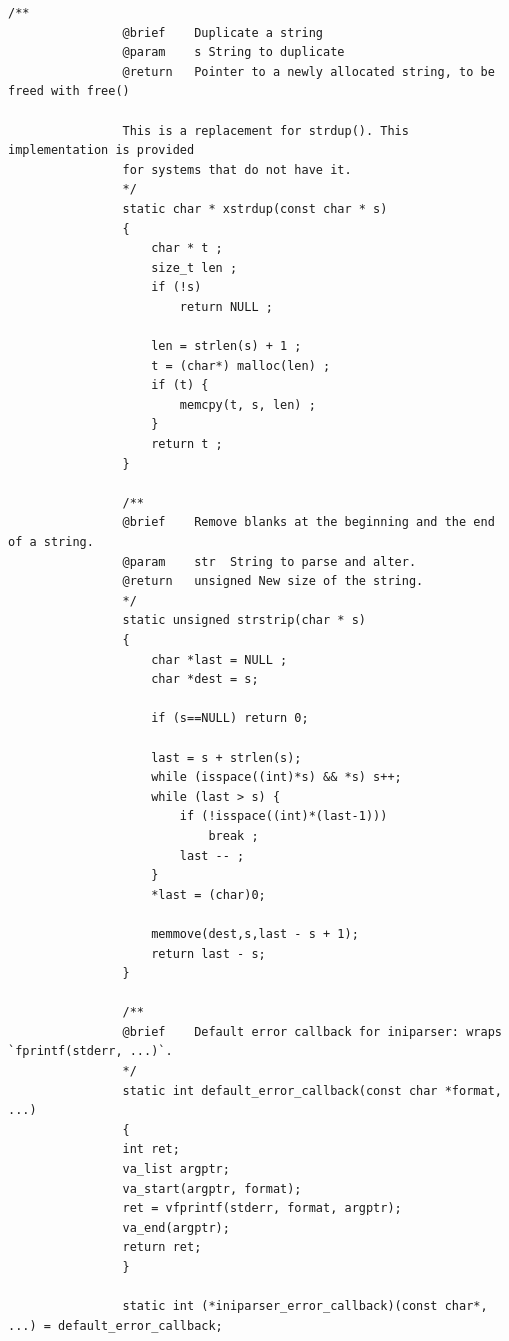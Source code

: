 \documentclass{article}
\begin{document}
\begin{Verbatim}[gobble=8]
                /**
                @brief    Duplicate a string
                @param    s String to duplicate
                @return   Pointer to a newly allocated string, to be freed with free()
                
                This is a replacement for strdup(). This implementation is provided
                for systems that do not have it.
                */
                static char * xstrdup(const char * s)
                {
                    char * t ;
                    size_t len ;
                    if (!s)
                        return NULL ;
                
                    len = strlen(s) + 1 ;
                    t = (char*) malloc(len) ;
                    if (t) {
                        memcpy(t, s, len) ;
                    }
                    return t ;
                }
                
                /**
                @brief    Remove blanks at the beginning and the end of a string.
                @param    str  String to parse and alter.
                @return   unsigned New size of the string.
                */
                static unsigned strstrip(char * s)
                {
                    char *last = NULL ;
                    char *dest = s;
                
                    if (s==NULL) return 0;
                
                    last = s + strlen(s);
                    while (isspace((int)*s) && *s) s++;
                    while (last > s) {
                        if (!isspace((int)*(last-1)))
                            break ;
                        last -- ;
                    }
                    *last = (char)0;
                
                    memmove(dest,s,last - s + 1);
                    return last - s;
                }
                
                /**
                @brief    Default error callback for iniparser: wraps `fprintf(stderr, ...)`.
                */
                static int default_error_callback(const char *format, ...)
                {
                int ret;
                va_list argptr;
                va_start(argptr, format);
                ret = vfprintf(stderr, format, argptr);
                va_end(argptr);
                return ret;
                }
                
                static int (*iniparser_error_callback)(const char*, ...) = default_error_callback;
                

\end{Verbatim}
\end{document}
